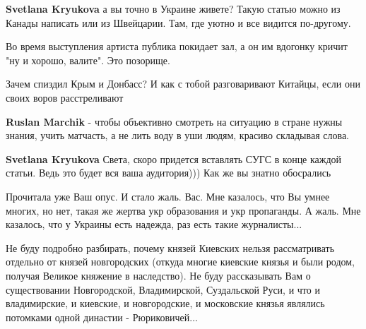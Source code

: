 \begin{itemize}
\begin{itemize}
\textbf{Svetlana Kryukova} а вы точно в Украине живете? Такую статью можно из Канады написать или из Швейцарии. Там, где уютно и все видится по-другому.

 
Во время выступления артиста публика покидает зал, а он им вдогонку кричит "ну и хорошо, валите". Это позорище.

 
Зачем спиздил Крым и Донбасс? И как с тобой разговаривают Китайцы, если они своих воров расстреливают

 
\textbf{Ruslan Marchik} - чтобы объективно смотреть на ситуацию в стране нужны знания, учить матчасть, а не лить воду в уши людям, красиво складывая слова.

 
\textbf{Svetlana Kryukova} Света, скоро придется вставлять СУГС в конце каждой статьи. Ведь это будет вся ваша аудитория))) Как же вы знатно обосрались

\end{itemize}

 

Прочитала уже Ваш опус. И стало жаль. Вас. Мне казалось, что Вы умнее многих,
но нет, такая же жертва укр образования и укр пропаганды. А жаль. Мне казалось,
что у Украины есть надежда, раз есть такие журналисты...

Не буду подробно разбирать, почему князей Киевских нельзя рассматривать
отдельно от князей новгородских (откуда многие киевские князья и были родом,
получая Великое княжение в наследство). Не буду рассказывать Вам о
существовании Новгородской, Владимирской, Суздальской Руси, и что и
владимирские, и киевские, и новгородские, и московские князья являлись
потомками одной династии - Рюриковичей... 


\end{itemize}
